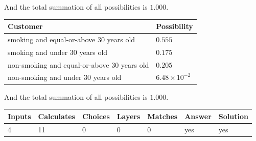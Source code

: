 \documentclass[12pt]{article}
\begin{document}
\noindent
And the total summation of all possibilities is $  %
1.000 $.
 
 
 
 
\noindent{}
 
 

 
 
 
\noindent{}
 
 

 
\noindent
\begin{tabular}{|l|l|}
\hline
Customer & Possibility \\
\hline
smoking  and  %
equal-or-above 30 years old &
  $ %
0.555$ \\
\hline
smoking  and  %
under 30 years old &
  $ %
0.175$ \\
\hline
 non-smoking and  %
equal-or-above 30 years old &
  $ %
0.205$ \\
\hline
 non-smoking and  %
under 30 years old &
  $ %
6.48 \times 10^{-2}$ \\
\hline
\end{tabular}
 
\noindent
 And the total summation of all possibilities is $  %
1.000 $.
 
 
 
\noindent{}
 
 

 
\vspace{0.3in}
   
   
   
   
\noindent\begin{tabular}{|l|l|l|l|l|l|l|}
 \hline
Inputs & Calculates & Choices & Layers & Matches & Answer & Solution \\ \hline
           4  & 
          11  & 
           0
  & 
           0  & 
           0  & 
  yes & 
  yes 
  \\ \hline
 \end{tabular}
   
   
   
   
\noindent{}
   
   
  
\end{document}
